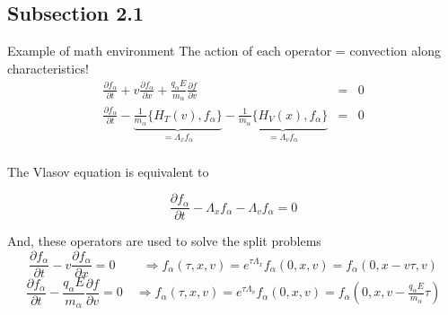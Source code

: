 \documentclass{beamer}
\begin{document}

\subsection{Subsection 2.1}


\begin{frame}{Example of math environment}
\vspace*{-2mm} %
The action of each operator = convection along characteristics!
\begin{eqnarray*}
\frac{\partial f_{\alpha}}{\partial t} + v\frac{\partial f_{\alpha}}{\partial x} + \frac{q_{\alpha}E}{m_{\alpha}}\frac{\partial f}{\partial v} & = & 0 \\
\frac{\partial f_{\alpha}}{\partial t} - \underbrace{\frac{1}{m_{\alpha}}\{H_T(v),f_{\alpha}\}}_{= \Lambda_xf_{\alpha}} -  \underbrace{\frac{1}{m_{\alpha}}\{H_V(x),f_{\alpha}\}}_{= \Lambda_vf_{\alpha}}  & = & 0 \\
\end{eqnarray*}

\vspace*{-3.5mm}The Vlasov equation is equivalent to

$$\frac{\partial f_{\alpha}}{\partial t} - \Lambda_xf_{\alpha} -  \Lambda_vf_{\alpha}   =  0 $$

And, these operators are used to solve the split problems
$$\frac{\partial f_{\alpha}}{\partial t} - v\frac{\partial f_{\alpha}}{\partial x}  =  0  \qquad\, \Rightarrow  f_{\alpha}(\tau ,x,v) = e^{\tau \Lambda_x}f_{\alpha}(0,x,v) = f_{\alpha}(0,x-v\tau , v)$$
$$\frac{\partial f_{\alpha}}{\partial t} - \frac{q_{\alpha}E}{m_{\alpha}}\frac{\partial f}{\partial v} =  0  \quad \Rightarrow  f_{\alpha}(\tau ,x,v) = e^{\tau \Lambda_v}f_{\alpha}(0,x,v) = f_{\alpha}(0,x,v-\tfrac{q_{\alpha}E}{m_{\alpha}}\tau )$$
 

\end{frame}

\end{document}
